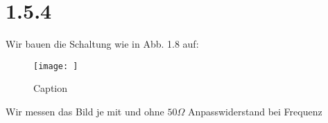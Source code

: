 \documentclass[main.tex]{subfiles}
\begin{document}
\section{1.5.4}
Wir bauen die Schaltung wie in Abb. 1.8 auf:
\begin{figure}
    \centering
    \texttt{[image: ]}
    \caption{Caption}
    \label{fig:my_label}
\end{figure}

Wir messen das Bild je mit und ohne $50 \Omega$ Anpasswiderstand bei Frequenz
\end{document}
